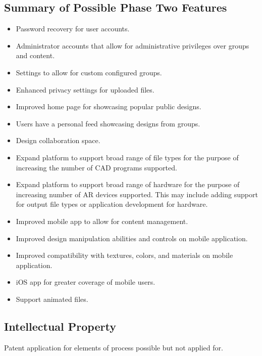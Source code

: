\subsection{Summary of Possible Phase Two Features}
\begin{itemize}
	\item Password recovery for user accounts.
	\item Administrator accounts that allow for administrative privileges over groups and content. 
	\item Settings to allow for custom configured groups. 
	\item Enhanced privacy settings for uploaded files.
	\item Improved home page for showcasing popular public designs. 
	\item Users have a personal feed showcasing designs from groups.
	\item Design collaboration space. 
	\item Expand platform to support broad range of file types for the purpose of increasing the number of CAD programs supported. 
	\item Expand platform to support broad range of hardware for the purpose of increasing number of AR devices supported. This may include adding support for output file types or application development for hardware. 
	\item Improved mobile app to allow for content management. 
	\item Improved design manipulation abilities and controls on mobile application. 
	\item Improved compatibility with textures, colors, and materials on mobile application.
	\item iOS app for greater coverage of mobile users.
	\item Support animated files. 
\end{itemize}


\subsection{Intellectual Property}
Patent application for elements of process possible but not applied for. 

